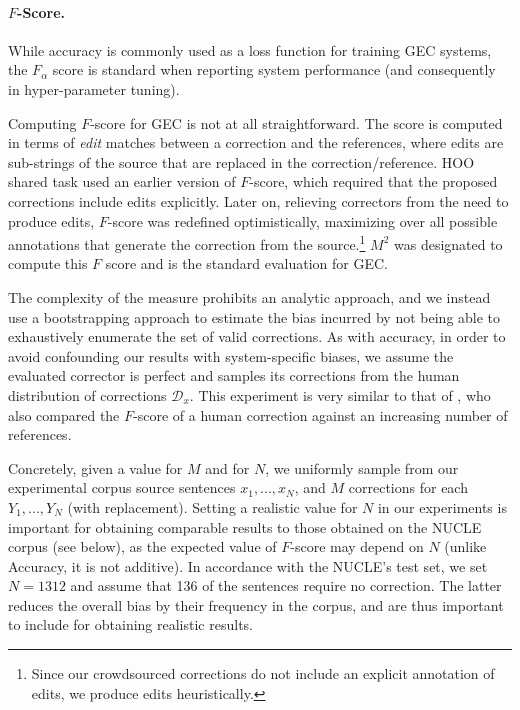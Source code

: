 \documentclass[letter,11pt]{article}
\begin{document}
\paragraph{$F$-Score.}
While accuracy is commonly used as a loss function for training GEC systems,
the $F_\alpha$ score is standard when reporting system performance (and consequently in hyper-parameter
tuning).

Computing $F$-score for GEC is not at all straightforward.
The score is computed in terms of {\it edit} matches between a correction and the references,
where edits are sub-strings of the source that are replaced in the correction/reference.
HOO shared task used an earlier version of $F$-score, which required that the proposed corrections include edits explicitly.
Later on, relieving correctors from the need to produce edits, $F$-score was redefined optimistically, maximizing
over all possible annotations that generate the correction from the source.\footnote{Since our crowdsourced corrections
	do not include an explicit annotation of edits, we produce edits heuristically.}
$M^2$ \cite{dahlmeier2012better} was designated to compute this $F$ score and is the standard evaluation for GEC.

The complexity of the measure prohibits an analytic approach, and
we instead use a bootstrapping approach to estimate the bias incurred
by not being able to exhaustively enumerate the set of valid corrections.
As with accuracy,
in order to avoid confounding our results with system-specific biases,
we assume the evaluated corrector is perfect and samples its corrections from the human distribution of corrections $\mathcal{D}_x$.
This experiment is very similar to that of ,
who also compared the $F$-score of a human correction against an increasing
number of references.

Concretely, given a value for $M$ and for $N$, we uniformly sample from our experimental
corpus source sentences $x_1,...,x_N$, and $M$ corrections for each $Y_1,...,Y_N$ (with replacement).
Setting a realistic value for $N$ in our experiments is important
for obtaining comparable results to those obtained on the NUCLE corpus (see below), 
as the expected value of $F$-score may depend on $N$ (unlike Accuracy, it is not additive).
In accordance with the NUCLE's test set,
we set $N=1312$ and assume that 136 of the sentences require no correction.
The latter reduces the overall bias by their frequency in the corpus,
and are thus important to include for obtaining realistic results.
\end{document}
